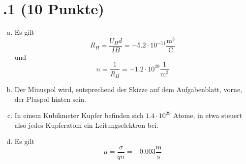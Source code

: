 \section*{\nr.1 \titone (10 Punkte)}
\begin{enumerate}[(a)]
\item Es gilt 
\begin{equation}
  R_H=\frac{U_Hd}{IB}=-5.2\cdot10^{-11}\frac{\mathrm{m}^3}{\mathrm{C}}
\end{equation}
und
\begin{equation}
  n=\frac{1}{R_H}=-1.2\cdot10^{29} \frac{1}{\mathrm{m}^3}
\end{equation}

\item Der Minuspol wird, entsprechend der Skizze auf dem Aufgabenblatt, vorne, der Pluspol hinten sein.

\item In einem Kubikmeter Kupfer befinden sich $1.4\cdot 10^{29}$ Atome, in etwa steuert also jedes Kupferatom ein Leitungselektron bei.

\item Es gilt 
\begin{equation}
\mu=\frac{\sigma}{qn}=-0.003 \frac{\mathrm{m}}{\mathrm{s}}
\end{equation}

\end{enumerate}